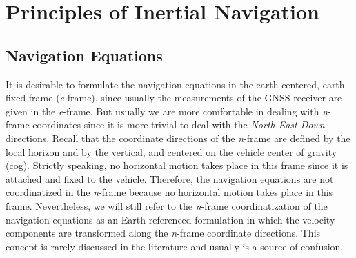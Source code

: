\documentclass[journal]{IEEEtran}
\begin{document}
%
\section{Principles of Inertial Navigation}\label{principles}

%
\subsection{Navigation Equations}
It is desirable to formulate the navigation equations in the earth-centered, earth-fixed frame (\textit{e}-frame), since usually the measurements of the GNSS receiver are given in the \textit{e}-frame. But usually we are more comfortable in dealing with \textit{n}-frame coordinates since it is more trivial to deal with the \textit{North-East-Down} directions.  Recall that the coordinate directions of the \textit{n}-frame are defined by the local horizon and by the vertical, and centered on the vehicle center of gravity (cog). Strictly speaking, no horizontal motion takes place in this frame since it is attached and fixed to the vehicle. Therefore,  the navigation equations are not coordinatized in the \textit{n}-frame because no horizontal motion takes place in this frame. Nevertheless, we will  still refer to the \textit{n}-frame coordinatization of the  navigation equations as an Earth-referenced formulation in which the velocity components are transformed along the \textit{n}-frame  coordinate directions. This concept is rarely discussed in the literature and usually is a source of confusion.\par
\end{document}
